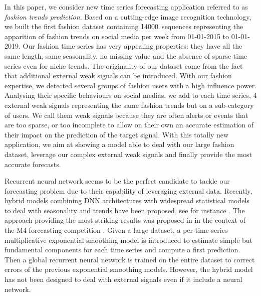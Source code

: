 \documentclass[letterpaper]{article} %
\newcommand{\numberts}{14000}
\begin{document}
In this paper, we consider  new time series forecasting application referred to as {\em fashion trends prediction}. Based on a cutting-edge image recognition technology, we built the first fashion dataset containing \numberts\ sequences representing the apparition of fashion trends on social media per week from 01-01-2015 to 01-01-2019. Our fashion time series has very appealing properties: they have all the same length, same seasonality, no missing value and the absence of sparse time series even for niche trends. The originality of our dataset come from the fact that additional external weak signals can be introduced. With our fashion expertise, we detected several groups of fashion users with a high influence power. Analysing their specific behaviours on social medias, we add to each time series, 4 external weak signals representing the same fashion trends but on a sub-category of users. We call them weak signals because they are often alerts or events that are too sparse, or too incomplete to allow on their own an accurate estimation of their impact on the prediction of the target signal. With this totally new application, we aim at showing a model able to deal with our large fashion dataset, leverage our complex external weak signals and finally provide the most accurate forecasts.
 
Recurrent neural network seems to be the perfect candidate to tackle our forecasting problem due to their capability of leveraging external data.  Recently, hybrid models combining DNN architectures with widespread statistical models to deal with seasonality and trends have been proposed, see for instance  \citep{zhang2003time,jianwei2019novel,bandara2020lstm}. The approach providing the most striking results was proposed in  \citep{smyl2020hybrid} in the context of the M4 forecasting competition \citep{makridakis2020m4}.  Given a large dataset, a per-time-series multiplicative exponential smoothing model is introduced to estimate simple but fundamental components for each time series and compute a first prediction. Then a global recurrent neural network is trained on the entire dataset to correct errors of the previous exponential smoothing models. %
However, the hybrid model has not been designed to deal with external signals even if it include a neural network.
\end{document}
